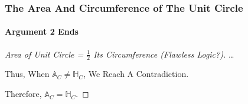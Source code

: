\begin{frame}
\frametitle{The Area And Circumference of The Unit Circle}
\framesubtitle{Argument 2 Ends}
\label{slide:arg-2-archimedes-5}
\begin{proof}[Area of Unit Circle = $\frac{1}{2}$ Its Circumference ({\tiny Flawless Logic?})]
\dots

Thus, When $\mathbb{A}_C\ne\mathbb{H}_C$, We Reach A Contradiction. 

Therefore, $\mathbb{A}_C=\mathbb{H}_C$.
\end{proof}
\end{frame}
